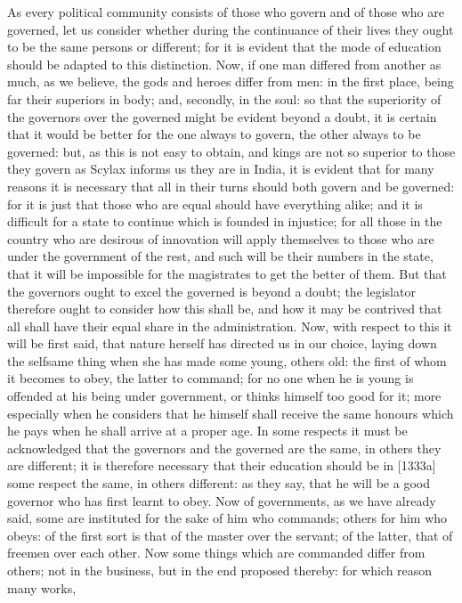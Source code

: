As every political community consists of those who govern and of those who
are governed, let us consider whether during the continuance of their
lives they ought to be the same persons or different; for it is evident
that the mode of education should be adapted to this distinction. Now, if
one man differed from another as much, as we believe, the gods and heroes
differ from men: in the first place, being far their superiors in body;
and, secondly, in the soul: so that the superiority of the governors over
the governed might be evident beyond a doubt, it is certain that it would
be better for the one always to govern, the other always to be governed:
but, as this is not easy to obtain, and kings are not so superior to those
they govern as Scylax informs us they are in India, it is evident that for
many reasons it is necessary that all in their turns should both govern
and be governed: for it is just that those who are equal should have
everything alike; and it is difficult for a state to continue which is
founded in injustice; for all those in the country who are desirous of
innovation will apply themselves to those who are under the government of
the rest, and such will be their numbers in the state, that it will be
impossible for the magistrates to get the better of them. But that the
governors ought to excel the governed is beyond a doubt; the legislator
therefore ought to consider how this shall be, and how it may be contrived
that all shall have their equal share in the administration. Now, with
respect to this it will be first said, that nature herself has directed us
in our choice, laying down the selfsame thing when she has made some
young, others old: the first of whom it becomes to obey, the latter to
command; for no one when he is young is offended at his being under
government, or thinks himself too good for it; more especially when he
considers that he himself shall receive the same honours which he pays
when he shall arrive at a proper age. In some respects it must be
acknowledged that the governors and the governed are the same, in others
they are different; it is therefore necessary that their education should
be in [1333a] some respect the same, in others different: as they say,
that he will be a good governor who has first learnt to obey. Now of
governments, as we have already said, some are instituted for the sake of
him who commands; others for him who obeys: of the first sort is that of
the master over the servant; of the latter, that of freemen over each
other. Now some things which are commanded differ from others; not in the
business, but in the end proposed thereby: for which reason many works,
